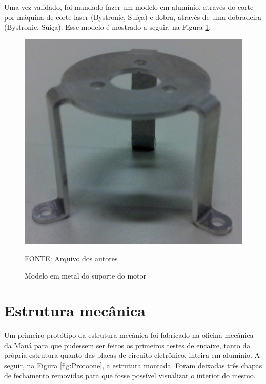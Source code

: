 \documentclass[
	12pt,				%
	openany,			%
	twoside,			%
	a4paper,			%
	english,			%
	french,				%
	spanish,			%
	brazil,				%
	oldfontcommands
	]{abntex2}
\begin{document}
\newpage

Uma vez validado, foi mandado fazer um modelo em alumínio, através do corte por máquina de corte laser (Bystronic, Suíça) e dobra, através de uma dobradeira (Bystronic, Suíça). Esse modelo é mostrado a seguir, na Figura \ref{fig:ProtoMS}.

\begin{figure}[th]
	\caption{Modelo em metal do suporte do motor}
	\centering
	\includegraphics[width=0.5\linewidth]{./figs/Proto_MS}
	
	\begin{small}
		FONTE: Arquivo dos autores
	\end{small}
	\label{fig:ProtoMS}
\end{figure}

\section{Estrutura mecânica}

Um primeiro protótipo da estrutura mecânica foi fabricado na oficina mecânica da Mauá para que pudessem ser feitos os primeiros testes de encaixe, tanto da própria estrutura quanto das placas de circuito eletrônico, inteira em alumínio. A seguir, na Figura \ref{fig:Protoone}, a estrutura montada. Foram deixadas três chapas de fechamento removidas para que fosse possível visualizar o interior do mesmo.
\end{document}
